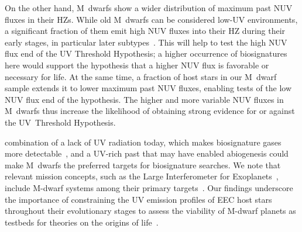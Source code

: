 \documentclass[twocolumn,twocolappendix,linenumbers]{aastex631}
\begin{document}
On the other hand, M~dwarfs show a wider distribution of maximum past \gls{NUV} fluxes in their \glspl{HZ}.
While old M~dwarfs can be considered low-UV environments, a significant fraction of them emit high \gls{NUV} fluxes into their \gls{HZ} during their early stages, in particular later subtypes~\citep{Richey-Yowell2023}.
This will help to test the high \gls{NUV} flux end of the UV Threshold Hypothesis; a higher occurrence of biosignatures here would support the hypothesis that a higher \gls{NUV} flux is favorable or necessary for life.
At the same time, a fraction of host stars in our M~dwarf sample extends it to lower maximum past \gls{NUV} fluxes, enabling tests of the low \gls{NUV} flux end of the hypothesis.
The higher and more variable \gls{NUV} fluxes in M~dwarfs thus increase the likelihood of obtaining strong evidence for or against the UV~Threshold Hypothesis.

 combination of a lack of \gls{UV} radiation today, which makes biosignature gases more detectable~\citep{Segura2005}, and a UV-rich past that may have enabled abiogenesis could make M~dwarfs the preferred targets for biosignature searches.
We note that relevant mission concepts, such as the Large Interferometer for Exoplanets~\citep[\life,][]{Quanz2022,Glauser2024}, include M-dwarf systems among their primary targets~\citep{Kammerer2018,Carrion-Gonzalez2023}.
Our findings underscore the importance of constraining the \gls{UV} emission profiles of \gls{EEC} host stars throughout their evolutionary stages to assess the viability of M-dwarf planets as testbeds for theories on the origins of life~\citep{Rimmer2021,Ranjan2023a}.
\end{document}
